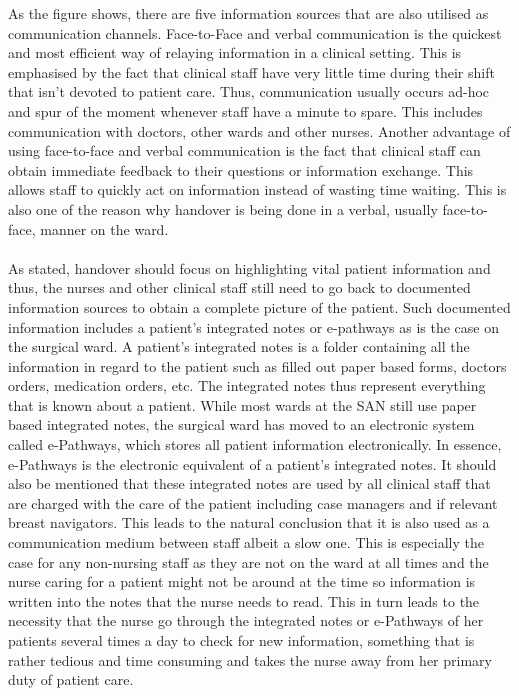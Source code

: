 As the figure shows, there are five information sources that are also utilised as communication channels. Face-to-Face and verbal communication is the quickest and most efficient way of relaying information in a clinical setting. This is emphasised by the fact that clinical staff have very little time during their shift that isn't devoted to patient care. Thus, communication usually occurs ad-hoc and spur of the moment whenever staff have a minute to spare. This includes communication with doctors, other wards and other nurses. Another advantage of using face-to-face and verbal communication is the fact that clinical staff can obtain immediate feedback to their questions or information exchange. This allows staff to quickly act on information instead of wasting time waiting. This is also one of the reason why handover is being done in a verbal, usually face-to-face, manner on the ward. 
\\ \\
As stated, handover should focus on highlighting vital patient information and thus, the nurses and other clinical staff still need to go back to documented information sources to obtain a complete picture of the patient. Such documented information includes a patient's integrated notes or e-pathways as is the case on the surgical ward. A patient's integrated notes is a folder containing all the information in regard to the patient such as filled out paper based forms, doctors orders, medication orders, etc. The integrated notes thus represent everything that is known about a patient. While most wards at the SAN still use paper based integrated notes, the surgical ward has moved to an electronic system called e-Pathways, which stores all patient information electronically. In essence, e-Pathways is the electronic equivalent of a patient's integrated notes. It should also be mentioned that these integrated notes are used by all clinical staff that are charged with the care of the patient including case managers and if relevant breast navigators. This leads to the natural conclusion that it is also used as a communication medium between staff albeit a slow one. This is especially the case for any non-nursing staff as they are not on the ward at all times and the nurse caring for a patient might not be around at the time so information is written into the notes that the nurse needs to read. This in turn leads to the necessity that the nurse go through the integrated notes or e-Pathways of her patients several times a day to check for new information, something that is rather tedious and time consuming and takes the nurse away from her primary duty of patient care.
